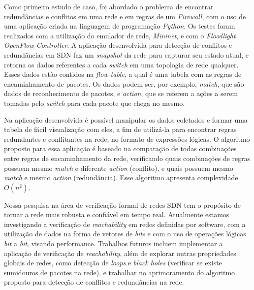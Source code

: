 \documentclass[a4paper,12pt,twoside]{article}
\begin{document}
Como primeiro estudo de caso, foi abordado o problema de encontrar redundâncias e conflitos em uma rede e em regras de um \textit{Firewall}, com o uso de uma aplicação criada na linguagem de programação \textit{Python}.
Os testes foram realizados com a utilização do emulador de rede, \textit{Mininet}, e com o \textit{Floodlight OpenFlow Controller}.
A aplicação desenvolvida para detecção de conflitos e redundâncias em SDN faz um \textit{snapshot} da rede para capturar seu estado atual, e retorna os dados referentes a cada \textit{switch} em uma topologia de rede qualquer.
Esses dados estão contidos na \textit{flow-table}, a qual é uma tabela com as regras de encaminhamento de pacotes.
Os dados podem ser, por exemplo, \textit{match}, que são dados de reconhecimento de pacotes, e \textit{action}, que se referem a ações a serem tomadas pelo \textit{switch} para cada pacote que chega no mesmo. 


Na aplicação desenvolvida é possível manipular os dados coletados e formar uma tabela de fácil visualização com eles, a fim de utilizá-la para encontrar regras redundantes e conflitantes na rede, no formato de expressões lógicas. 
O algoritmo proposto para essa aplicação é baseado na comparação de todas combinações entre regras de encaminhamento da rede, verificando quais combinações de regras possuem mesmo \textit{match} e diferente \textit{action} (conflito), e quais possuem mesmo \textit{match} e mesmo \textit{action} (redundância).
Esse algoritmo apresenta complexidade $O(n^{2})$. 


Nossa pesquisa na área de verificação formal de redes SDN tem o propósito de tornar a rede mais robusta e confiável em tempo real.
Atualmente estamos investigando a verificação de \textit{reachability} em redes definidas por software, com a utilização de dados na forma de vetores de \textit{bits} e com o uso de operações lógicas \textit{bit} a \textit{bit}, visando performance.
Trabalhos futuros incluem implementar a aplicação de verificação de \textit{reachability}, além de explorar outras propriedades globais de redes, como detecção de \textit{loops} e \textit{black holes} (verificar se existe sumidouros de pacotes na rede), e trabalhar no aprimoramento do algoritmo proposto para detecção de conflitos e redundâncias na rede.
\end{document}
